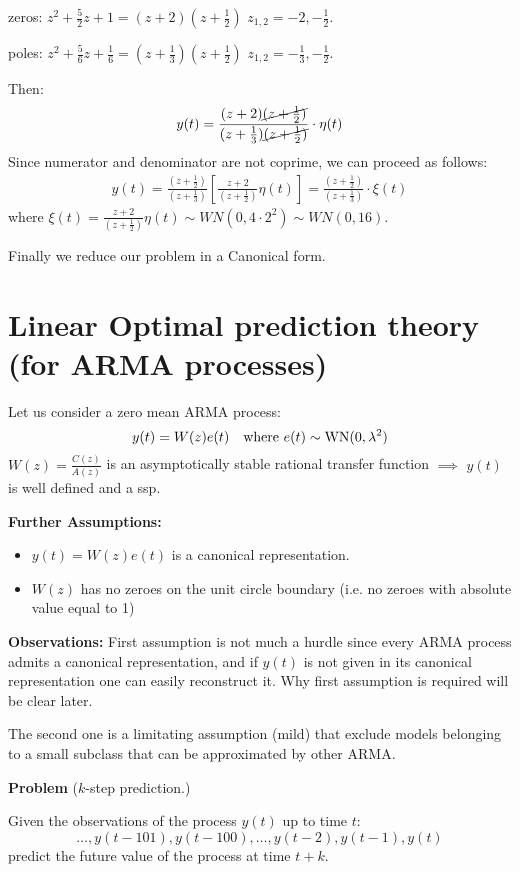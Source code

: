 zeros: $z^2+\frac{5}{2}z+1=(z+2)(z+\frac{1}{2})$    $z_{1,2}=-2,-\frac{1}{2}$.

poles: $z^2+\frac{5}{6}z+\frac{1}{6}=(z+\frac{1}{3})(z+\frac{1}{2})$    $z_{1,2}=-\frac{1}{3},-\frac{1}{2}$.

Then:
\begin{align*}
	y(t)=\frac{(z+2)\cancel{(z+\frac{1}{2})}}{(z+\frac{1}{3})\cancel{(z+\frac{1}{2})}}\cdot \eta(t) 
\end{align*}
Since numerator and denominator are not coprime, we can proceed as follows:
\begin{align*}
	y(t)=\frac{(z+\frac{1}{2})}{(z+\frac{1}{3})}\left[\frac{z+2}{(z+\frac{1}{2})}\eta(t)\right]=\frac{(z+\frac{1}{2})}{(z+\frac{1}{3})}\cdot \xi(t)
\end{align*}
where $\xi(t)=\frac{z+2}{(z+\frac{1}{2})}\eta(t)\sim WN(0,4\cdot2^2)\sim WN(0,16)$.

Finally we reduce our problem in a Canonical form.
\section{Linear Optimal prediction theory (for ARMA processes) }
Let us consider a zero mean ARMA process:
\[
	y(t)=W(z)e(t) \quad \text{where }e(t)\sim \operatorname{WN}(0,\lambda^{2} )
\]
$W(z)=\frac{C(z)}{A(z)}$ is an asymptotically stable rational transfer function $\implies$ $y(t)$ is well defined and a \gls{ssp}.

\textbf{Further Assumptions:}
\begin{itemize}
	\item $y(t) =W(z)e(t)$ is a canonical representation.
	\item $W(z)$ has no zeroes on the unit circle boundary (i.e. no zeroes with absolute value equal to 1)
\end{itemize}
 
\textbf{Observations:}
First assumption is not much a hurdle since every ARMA process admits a canonical representation, and if $y(t)$ is not given in its canonical representation one can easily reconstruct it. Why first assumption is required will be clear later. 

The second one is a limitating assumption (mild) that exclude models belonging to a small subclass that can be approximated by other ARMA.

\textbf{Problem} ($k$-step prediction.)

Given the observations of the process $y(t)$ up to time $t$:
$$
	\ldots , y(t-101), y(t-100), \ldots , y(t-2), y(t-1), y(t)
$$
predict the future value of the process at time $t + k$.


